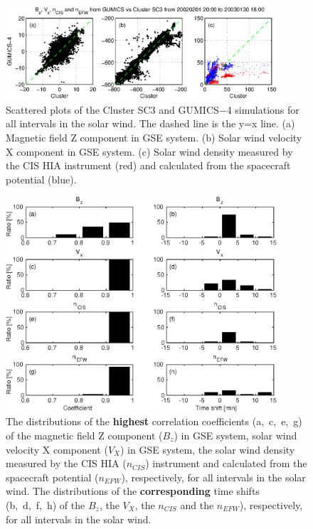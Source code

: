 \documentclass[linenumbers,draft]{agujournal}
\begin{document}
\pagebreak

\begin{figure}[h]
\centering
\includegraphics[width=0.9\textwidth,angle=0]{swe-2021-corr-f04}
\caption{Scattered plots of the Cluster SC3 and GUMICS$-$4 simulations for all intervals in the solar wind. The dashed line is the y=x line. (a) Magnetic field Z component in GSE system. (b) Solar wind velocity X component in GSE system. (c) Solar wind density measured by the CIS HIA instrument (red) and calculated from the spacecraft potential (blue).}
\label{fig:swscatplot}
\end{figure}

\pagebreak

\begin{figure}[h]
\centering
\includegraphics[width=0.9\textwidth,angle=0]{swe-2021-corr-f05}  
\caption{The distributions of the \textbf{highest} correlation coefficients (a,~c,~e,~g) of the magnetic field Z component ($B_z$) in GSE system, solar wind velocity X component ($V_X$) in GSE system, the solar wind density measured by the CIS HIA ($n_{CIS}$) instrument and calculated from the spacecraft potential ($n_{EFW}$), respectively, for all intervals in the solar wind. The distributions of the \textbf{corresponding} time shifts (b,~d,~f,~h) of the $B_z$, the $V_X$, the $n_{CIS}$ and the $n_{EFW}$), respectively, for all intervals in the solar wind.}
\label{fig:swcorrplot}
\end{figure}
\end{document}
